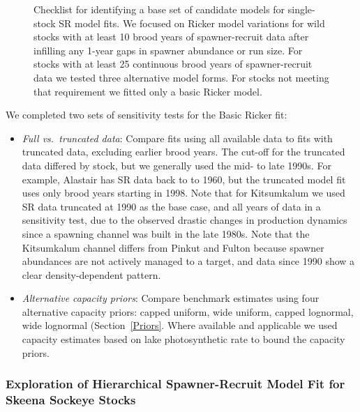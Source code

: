 \documentclass[french,11pt]{book}
\begin{document}
\begin{figure}[htb]

{\centering {} 

}

\caption{Checklist for identifying a base set of candidate models for single-stock SR model fits. We focused on Ricker model variations for wild stocks with at least 10 brood years of spawner-recruit data after infilling any 1-year gaps in spawner abundance or run size. For stocks with at least 25 continuous brood years of spawner-recruit data we tested three alternative model forms. For stocks not meeting that requirement we fitted only a basic Ricker model.}\label{fig:CandidateModels}
\end{figure}
\clearpage

We completed two sets of sensitivity tests for the Basic Ricker fit:
\begin{itemize}

\item
  \emph{Full vs.~truncated data}: Compare fits using all available data to fits with truncated data, excluding earlier brood years. The cut-off for the truncated data differed by stock, but we generally used the mid- to late 1990s. For example, Alastair has SR data back to to 1960, but the truncated model fit uses only brood years starting in 1998. Note that for Kitsumkalum we used SR data truncated at 1990 as the base case, and all years of data in a sensitivity test, due to the observed drastic changes in production dynamics since a spawning channel was built in the late 1980s. Note that the Kitsumkalum channel differs from Pinkut and Fulton because spawner abundances are not actively managed to a target, and data since 1990 show a clear density-dependent pattern.
\item
  \emph{Alternative capacity priors}: Compare benchmark estimates using four alternative capacity priors: capped uniform, wide uniform, capped lognormal, wide lognormal (Section~\ref{Priors}. Where available and applicable we used capacity estimates based on lake photosynthetic rate to bound the capacity priors.
\end{itemize}
\subsubsection{Exploration of Hierarchical Spawner-Recruit Model Fit for Skeena Sockeye Stocks}\label{HBMExploration}
\end{document}
